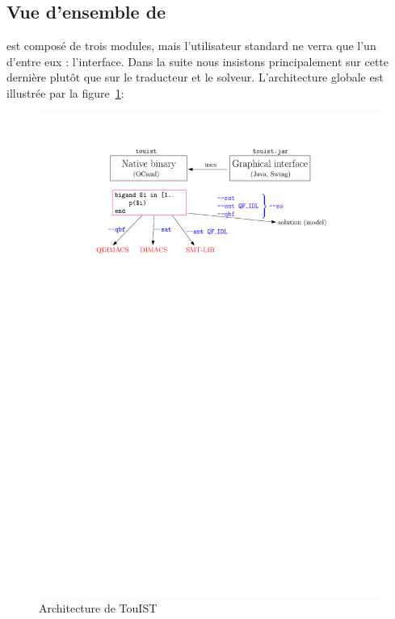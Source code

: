 \subsection{Vue d'ensemble de \touist}\label{sec:sat_interface}






















\touist est composé de trois modules, mais l'utilisateur standard ne verra que l'un d'entre eux : l'interface. Dans la suite nous insistons principalement sur cette dernière plutôt que sur le traducteur et le solveur. L'architecture globale est illustrée par la figure~\ref{fig:architectureTouisT}:

\begin{figure}[htbp]
\centering
  \includegraphics[scale=0.80]{figures/architecture.pdf}
  \caption{Architecture de TouIST}
  \label{fig:architectureTouisT}
\end{figure}

